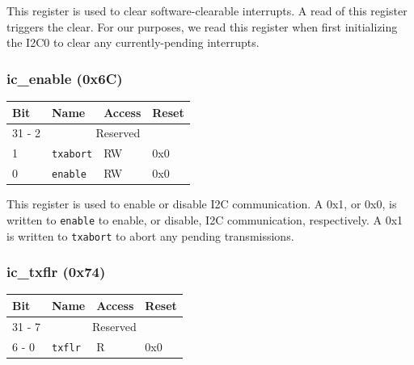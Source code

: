 \documentclass[11pt, twoside, pdftex]{article}
\begin{document}
This register is used to clear software-clearable interrupts. A read of this register triggers the clear. For our purposes, we read this register when first initializing the I2C0 to clear any currently-pending interrupts.

\subsubsection{ic\_enable (0x6C)}

\begin{table}[H]
    \centering
    \begin{tabular}{|l|l|l|l|}
        \hline
            \textbf{Bit}
            & \textbf{Name}
            & \textbf{Access}
            & \textbf{Reset}
        \\\hline
            31 - 2
            & \multicolumn{3}{|c|}{Reserved}
        \\\hline
            1
            & \texttt{txabort}
            & RW
            & 0x0
        \\\hline
            0
            & \texttt{enable}
            & RW
            & 0x0
        \\\hline
    \end{tabular}
\end{table}

This register is used to enable or disable I2C communication. A 0x1, or 0x0, is written to \texttt{enable} to enable, or disable, I2C communication, respectively. A 0x1 is written to \texttt{txabort} to abort any pending transmissions.

\subsubsection{ic\_txflr (0x74)}

\begin{table}[H]
    \centering
    \begin{tabular}{|l|l|l|l|}
        \hline
            \textbf{Bit}
            & \textbf{Name}
            & \textbf{Access}
            & \textbf{Reset}
        \\\hline
            31 - 7
            & \multicolumn{3}{|c|}{Reserved}
        \\\hline
            6 - 0
            & \texttt{txflr}
            & R
            & 0x0
        \\\hline
    \end{tabular}
\end{table}
\end{document}
